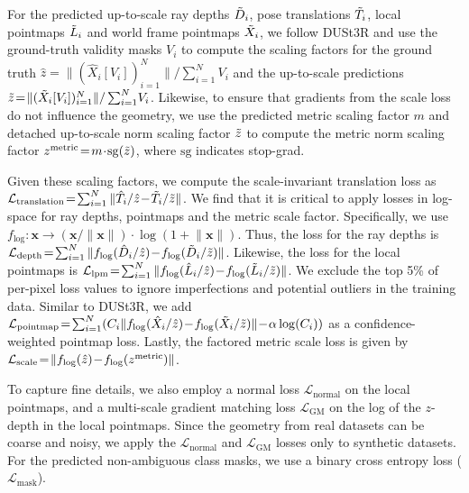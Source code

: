 For the predicted up-to-scale ray depths $\tilde{D}_i$, pose translations $\tilde{T}_i$, local pointmaps $\tilde{L}_i$ and world frame pointmaps $\tilde{X}_i$, we follow DUSt3R \cite{WangLCCR2024} and use the ground-truth validity masks $V_i$ to compute the scaling factors for the ground truth $\hat{z} \!=\! \| (\hat{X}_i[V_i])_{i=1}^{N} \| / \sum_{i=1}^N \!V_i$ and the up-to-scale predictions $\tilde{z} \!=\! \| (\tilde{X}_i[V_i])_{i=1}^{N} \| / \sum_{i=1}^N \!V_i$. 
Likewise, to ensure that gradients from the scale loss do not influence the geometry, we use the predicted metric scaling factor $m$ and detached up-to-scale norm scaling factor $\tilde{z}$ to compute the metric norm scaling factor ${z}^\text{metric} \!=\! m \!\cdot\! \mathrm{sg}(\tilde{z})$, where $\mathrm{sg}$ indicates stop-grad.


Given these scaling factors, we compute the scale-invariant translation loss as $\mathcal{L}_\text{translation} \!=\! \sum_{i=1}^N \| \hat{T}_i/\hat{z} \!-\! \tilde{T}_i/\tilde{z} \|$.
We find that it is critical to apply losses in log-space for ray depths, pointmaps and the metric scale factor.
Specifically, we use $f_\mathrm{log} \colon \mathbf{x} \to (\mathbf{x}/\|\mathbf{x}\|) \!\cdot\! \log(1 \!+\! \|\mathbf{x}\|)$.
Thus, the loss for the ray depths is $\mathcal{L}_\text{depth} \!=\! \sum_{i=1}^N \| f_\mathrm{log}(\hat{D}_i/\hat{z}) \!-\! f_\mathrm{log}(\tilde{D}_i/\tilde{z}) \|$.
Likewise, the loss for the local pointmaps is $\mathcal{L}_\text{lpm} \!=\! \sum_{i=1}^N \| f_\mathrm{log}(\hat{L}_i/\hat{z}) \!-\! f_\mathrm{log}(\tilde{L}_i/\tilde{z}) \|$.
We exclude the top 5\% of per-pixel loss values to ignore imperfections and potential outliers in the training data.
Similar to DUSt3R, we add $\mathcal{L}_\text{pointmap} \!=\! \sum_{i=1}^N (C_i \| f_\mathrm{log}(\hat{X}_i/\hat{z}) \!-\! f_\mathrm{log}(\tilde{X}_i/\tilde{z}) \| \!-\! \alpha \log(C_i))$ as a confidence-weighted pointmap loss.
Lastly, the factored metric scale loss is given by $\mathcal{L}_\text{scale} \!=\! \| f_\mathrm{log}(\hat{z}) \!-\! f_\mathrm{log}({z}^\text{metric}) \|$.

To capture fine details, %
we also employ a normal loss $\mathcal{L}_\text{normal}$ \cite{WangXDXDTY2025} on the local pointmaps, and a multi-scale gradient matching loss $\mathcal{L}_\text{GM}$ \cite{RanftLHSK2022, YangKHZXFZ2024} on the log of the $z$-depth in the local pointmaps.
Since the geometry from real datasets can be coarse and noisy, we apply the $\mathcal{L}_\text{normal}$ and $\mathcal{L}_\text{GM}$ losses only to synthetic datasets.
For the predicted non-ambiguous class masks, we use a binary cross entropy loss ($\mathcal{L}_\text{mask}$).

